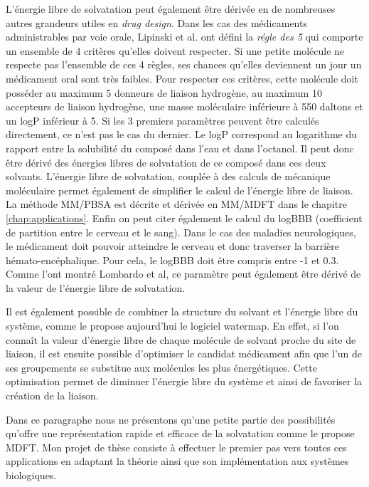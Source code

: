 L'énergie libre de solvatation peut également être dérivée en de nombreuses autres grandeurs utiles en \textit{drug design}. Dans les cas des médicaments administrables par voie orale, Lipinski et al.\cite{Lipinski_lead_2004} ont défini la \textit{régle des 5} qui comporte un ensemble de 4 critères qu'elles doivent respecter. Si une petite molécule ne respecte pas l'ensemble de ces 4 règles, ses chances qu'elles deviennent un jour un médicament oral sont très faibles. Pour respecter ces critères, cette molécule doit posséder au maximum 5 donneurs de liaison hydrogène, au maximum 10 accepteurs de liaison hydrogène, une masse moléculaire inférieure à 550 daltons et un logP inférieur à 5. Si les 3 premiers paramètres peuvent être calculés directement, ce n'est pas le cas du dernier. Le logP correspond au logarithme du rapport entre la solubilité du composé dans l'eau et dans l'octanol. Il peut donc être dérivé des énergies libres de solvatation de ce composé dans ces deux solvants. L'énergie libre de solvatation, couplée à des calculs de mécanique moléculaire permet également de simplifier le calcul de l'énergie libre de liaison. La méthode MM/PBSA\cite{genheden_mm/pbsa_2015} est décrite et dérivée en MM/MDFT dans le chapitre \ref{chap:applications}. Enfin on peut citer également le calcul du logBBB (coefficient de partition entre le cerveau et le sang). Dans le cas des maladies neurologiques, le médicament doit pouvoir atteindre le cerveau et donc traverser la barrière hémato-encéphalique. Pour cela, le logBBB doit être compris entre -1 et 0.3\cite{Vilar_prediction_2010}. Comme l'ont montré Lombardo et al\cite{Lombardo_computation_1996}, ce paramètre peut également être dérivé de la valeur de l'énergie libre de solvatation.

Il est également possible de combiner la structure du solvant et l'énergie libre du système, comme le propose aujourd'hui le logiciel watermap\cite{abel_role_2008,Young_motifs_2007}. En effet, si l'on connaît la valeur d'énergie libre de chaque molécule de solvant proche du site de liaison, il est ensuite possible d'optimiser le candidat médicament afin que l'un de ses groupements se substitue aux molécules les plus énergétiques. Cette optimisation permet de diminuer l'énergie libre du système et ainsi de favoriser la création de la liaison. 

Dans ce paragraphe nous ne présentons qu'une petite partie des possibilités qu'offre une représentation rapide et efficace de la solvatation comme le propose MDFT. Mon projet de thèse consiste à effectuer le premier pas vers toutes ces applications en adaptant la théorie ainsi que son implémentation aux systèmes biologiques.




\clearpage
\strut
\vspace{10\baselineskip}


